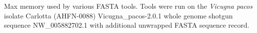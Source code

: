 Max memory used by various FASTA tools. Tools were run on the \textit{Vicugna pacos} isolate Carlotta (AHFN-0088) Vicugna\_pacos-2.0.1 whole genome shotgun sequence NW\_005882702.1 with additional unwrapped FASTA sequence record.
  
  